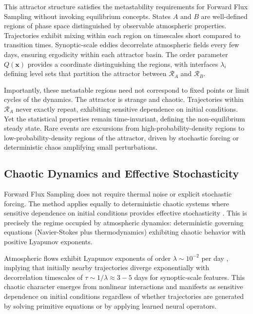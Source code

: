 \documentclass[11pt]{article}
\begin{document}
This attractor structure satisfies the metastability requirements for Forward Flux Sampling without invoking equilibrium concepts. States $A$ and $B$ are well-defined regions of phase space distinguished by observable atmospheric properties. Trajectories exhibit mixing within each region on timescales short compared to transition times. Synoptic-scale eddies decorrelate atmospheric fields every few days, ensuring ergodicity within each attractor basin. The order parameter $Q(\mathbf{x})$ provides a coordinate distinguishing the regions, with interfaces $\lambda_i$ defining level sets that partition the attractor between $\mathcal{R}_A$ and $\mathcal{R}_B$.

Importantly, these metastable regions need not correspond to fixed points or limit cycles of the dynamics. The attractor is strange and chaotic. Trajectories within $\mathcal{R}_A$ never exactly repeat, exhibiting sensitive dependence on initial conditions. Yet the statistical properties remain time-invariant, defining the non-equilibrium steady state. Rare events are excursions from high-probability-density regions to low-probability-density regions of the attractor, driven by stochastic forcing or deterministic chaos amplifying small perturbations.

\subsection{Chaotic Dynamics and Effective Stochasticity}

Forward Flux Sampling does not require thermal noise or explicit stochastic forcing. The method applies equally to deterministic chaotic systems where sensitive dependence on initial conditions provides effective stochasticity \citep{allen2009forward}. This is precisely the regime occupied by atmospheric dynamics: deterministic governing equations (Navier-Stokes plus thermodynamics) exhibiting chaotic behavior with positive Lyapunov exponents.

Atmospheric flows exhibit Lyapunov exponents of order $\lambda \sim 10^{-2}$ per day \citep{lorenz1969atmospheric}, implying that initially nearby trajectories diverge exponentially with decorrelation timescales of $\tau \sim 1/\lambda \approx 3-5$ days for synoptic-scale features. This chaotic character emerges from nonlinear interactions and manifests as sensitive dependence on initial conditions regardless of whether trajectories are generated by solving primitive equations or by applying learned neural operators.
\end{document}

